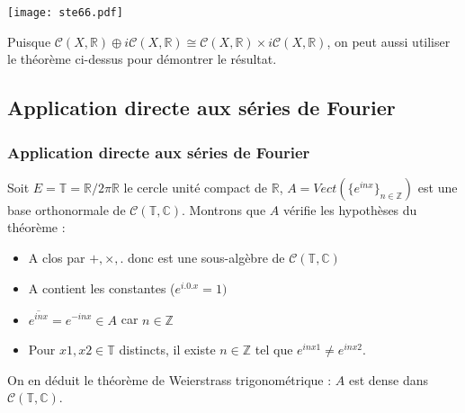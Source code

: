 \documentclass[
	10pt, %
	xcolor={svgnames}
]{beamer}
\begin{document}

\begin{frame}

	\center\texttt{[image: ste66.pdf]}

	\par Puisque \( \mathcal{C}(X,\mathbb{R}) \oplus i\mathcal{C}(X,\mathbb{R}) \cong \mathcal{C}(X,\mathbb{R}) \times i\mathcal{C}(X,\mathbb{R}) \), on peut aussi utiliser le théorème ci-dessus pour démontrer le résultat. \nocite{nlab:direct_sum_of_banach_spaces} 
\end{frame}



\begin{frame}
\subsection{Application directe aux séries de Fourier}
\frametitle{Application directe aux séries de Fourier}

\par Soit \( E = \mathbb{T} = \mathbb{R}/2\pi\mathbb{R} \) le cercle unité compact de \( \mathbb{R} \), \(A = Vect(\{e^{inx}\}_{n \in \mathbb{Z}})\) est une base orthonormale de \( \mathcal{C}(\mathbb{T},\mathbb{C}) \). Montrons que \( A \) vérifie les hypothèses du théorème :
\begin{itemize}
	\item A clos par \( +,\times,. \) donc est une sous-algèbre de \( \mathcal{C}(\mathbb{T},\mathbb{C}) \)
	\item A contient les constantes (\( e^{i.0.x} = 1) \)
	\item \( \overline{e^{inx}} = e^{-inx} \in A \) car \( n \in \mathbb{Z} \)
	\item Pour \( x1, x2 \in \mathbb{T} \) distincts, il existe \( n \in \mathbb{Z} \) tel que 
		\( e^{inx1} \neq e^{inx2} \).
\end{itemize}

On en déduit le théorème de Weierstrass trigonométrique : \( A \) est dense dans \( \mathcal{C}(\mathbb{T},\mathbb{C}) \).

\end{frame}
\end{document}
